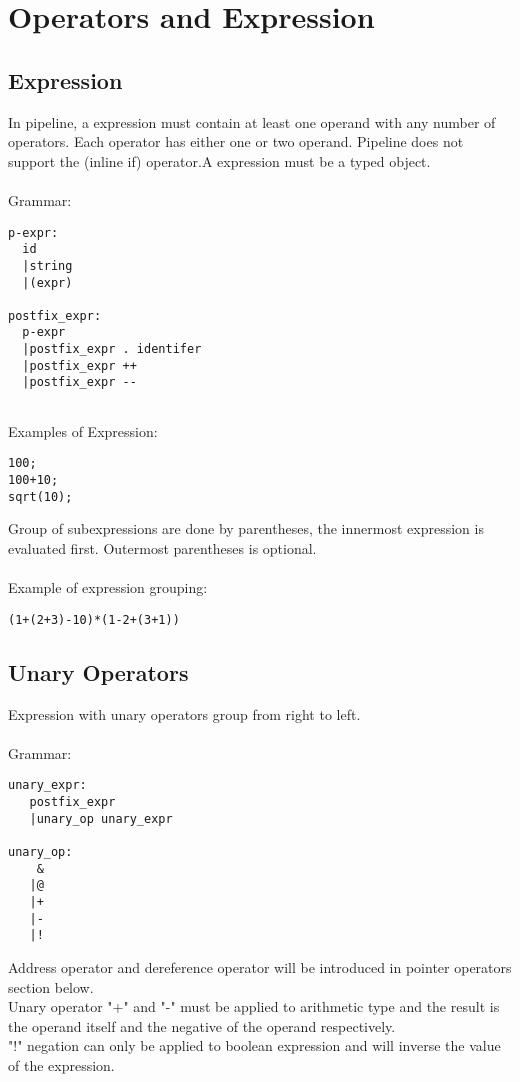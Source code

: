 \documentclass[./LRM_main.tex]{subfiles}
\begin{document}


\chapter{Operators and Expression}
\section{Expression}
In pipeline, a expression must contain at least one operand with any number of operators. Each operator has either one or two operand. Pipeline does not support the (inline if) operator.A expression must be a typed object.\\ 
\vspace{1mm}\\
Grammar:
\begin{lstlisting}
p-expr:
  id
  |string
  |(expr)

postfix_expr:
  p-expr
  |postfix_expr . identifer
  |postfix_expr ++
  |postfix_expr --
    
\end{lstlisting}
Examples of Expression:
\begin{lstlisting}
100;
100+10;
sqrt(10);
\end{lstlisting}
\vspace{1 mm}
Group of subexpressions are done by parentheses, the innermost expression is evaluated first. Outermost parentheses is optional.\\
\vspace{1 mm}\\
Example of expression grouping:
\begin{lstlisting}
(1+(2+3)-10)*(1-2+(3+1))
\end{lstlisting}
\section{Unary Operators}
Expression with unary operators group from right to left.\\
\vspace{1 mm}\\
Grammar:
\begin{lstlisting}
unary_expr:
   postfix_expr
   |unary_op unary_expr

unary_op:
    &
   |@
   |+
   |-
   |!
\end{lstlisting}
Address operator and dereference operator will be introduced in pointer operators section below.\\
Unary operator "+" and "-" must be applied to arithmetic type and the result is the operand itself and the negative of the operand respectively.\\
"!" negation can only be applied to boolean expression and will inverse the value of the expression.\\ 
\end{document}
